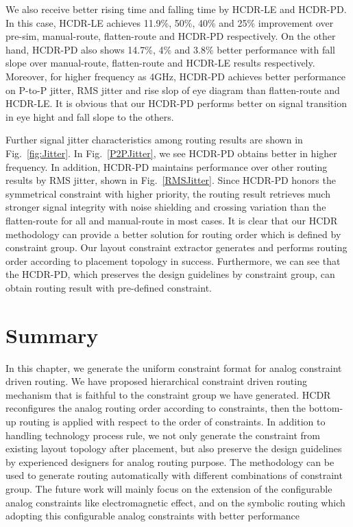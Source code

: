     We also receive better rising time and falling time by HCDR-LE and HCDR-PD. In this case, HCDR-LE achieves 11.9\%, 50\%, 40\% and 25\% improvement over pre-sim, manual-route, flatten-route and HCDR-PD respectively. On the other hand, HCDR-PD also shows 14.7\%, 4\% and 3.8\% better performance with fall slope over manual-route, flatten-route and HCDR-LE results respectively. Moreover, for higher frequency as 4GHz, HCDR-PD achieves better performance on P-to-P jitter, RMS jitter and rise slop of eye diagram than flatten-route and HCDR-LE. It is obvious that our HCDR-PD performs better on signal transition in eye hight and fall slope to the others. 
    
    Further signal jitter characteristics among routing results are shown in Fig.~\ref{fig:Jitter}. In Fig.~\ref{P2PJitter}, we see HCDR-PD obtains better in higher frequency. In addition, HCDR-PD maintains performance over other routing results by RMS jitter, shown in Fig.~\ref{RMSJitter}. Since HCDR-PD honors the symmetrical constraint with higher priority, the routing result retrieves much stronger signal integrity with noise shielding and crossing variation than the flatten-route for all and manual-route in most cases. It is clear that our HCDR methodology can provide a better solution for routing order which is defined by constraint group. Our layout constraint extractor generates and performs routing order according to placement topology in success. Furthermore, we can see that the HCDR-PD, which preserves the design guidelines by constraint group, can obtain routing result with pre-defined constraint.

  \section{Summary}\label{sec:CUCLMSum}

    In this chapter, we generate the uniform constraint format for analog constraint driven routing. We have proposed hierarchical constraint driven routing mechanism that is faithful to the constraint group we have generated. HCDR reconfigures the analog routing order according to constraints, then the bottom-up routing is applied with respect to the order of constraints. In addition to handling technology process rule, we not only generate the constraint from existing layout topology after placement, but also preserve the design guidelines by experienced designers for analog routing purpose. The methodology can be used to generate routing automatically with different combinations of constraint group. The future work will mainly focus on the extension of the configurable analog constraints like electromagnetic effect, and on the symbolic routing which adopting this configurable analog constraints with better performance

